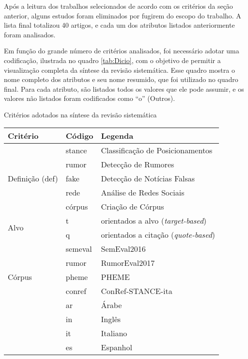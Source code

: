\documentclass[
	12pt, oneside, a4paper, english, brazil
]{abntex2ppgsi}
\begin{document}
Após a leitura dos trabalhos selecionados de acordo com os critérios da seção anterior, alguns estudos foram eliminados por fugirem do escopo do trabalho. A lista final totalizou 40 artigos, e cada um dos atributos listados anteriormente foram analisados. 

Em função do grande número de critérios analisados, foi necessário adotar uma codificação, ilustrada no quadro \ref{tab:Dicio}, com o objetivo de permitir a visualização completa da síntese da revisão sistemática. Esse quadro mostra o nome completo dos atributos e seu nome resumido, que foi utilizado no quadro final. Para cada atributo, são listados todos os valores que ele pode assumir, e os valores não listados foram codificados como ``o'' (Outros).

\begin{quadro}[H]
	\caption{Critérios adotados na síntese da revisão sistemática}
    \tiny
    \centering
	\begin{tabular}{
            | p{1.5in} | p{0.5in} | p{3in} |
        }
        \hline
        Critério & Código & Legenda \\ \hline
        \multirow{5}{*}{ Definição (def) }
            & stance & Classificação de Posicionamentos \\
            & rumor & Detecção de Rumores \\
            & fake & Detecção de Notícias Falsas \\ 
            & rede & Análise de Redes Sociais \\
            & córpus & Criação de Córpus \\ \hline
        \multirow{2}{*}{ Alvo }
            & t & orientados a alvo ({\em target-based}) \\ 
            & q & orientados a citação ({\em quote-based}) \\ \hline
        \multirow{5}{*}{ Córpus }
            & semeval & SemEval2016 \cite{semeval2016} \\
            & rumor & RumorEval2017 \cite{rumoreval2017} \\
            & pheme & PHEME \cite{pheme} \\
            & conref & ConRef-STANCE-ita \cite{paolo2019} \\ \hline
        \multirow{6}{*}{ Idioma }
            & ar & Árabe \\ 
            & in & Inglês \\ 
            & it & Italiano \\ 
            & es & Espanhol \\ 

\end{tabular}
\end{quadro}
\end{document}
